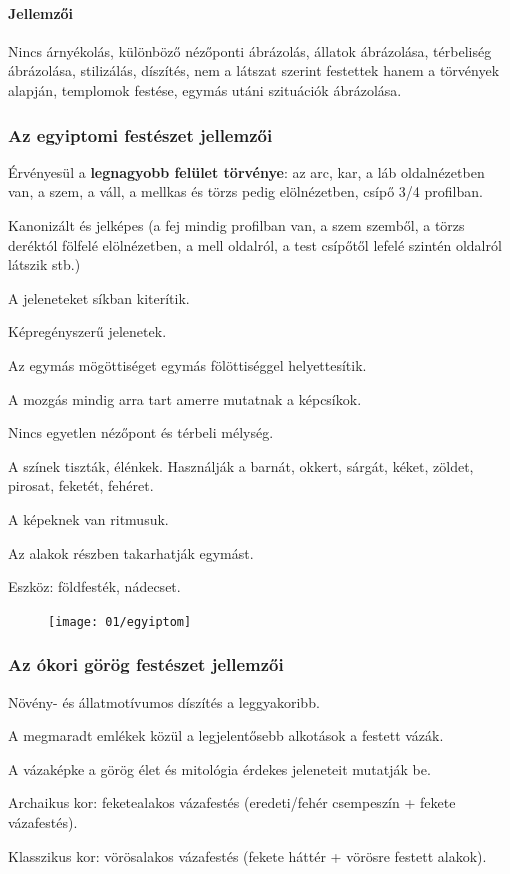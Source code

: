 \paragraph{Jellemzői} Nincs árnyékolás, különböző nézőponti ábrázolás, állatok ábrázolása, térbeliség ábrázolása, stilizálás, díszítés, nem a látszat szerint festettek hanem a törvények alapján, templomok festése, egymás utáni szituációk ábrázolása.


\subsubsection{Az egyiptomi festészet jellemzői}
\begin{compactitem}
	\item Érvényesül a \textbf{legnagyobb felület törvénye}: az arc,  kar, a láb oldalnézetben van, a szem, a váll, a mellkas és törzs pedig elölnézetben, csípő 3/4 profilban.
	\item Kanonizált és jelképes (a fej mindig profilban van, a szem szemből, a törzs deréktól
	fölfelé elölnézetben, a mell oldalról, a test csípőtől lefelé szintén oldalról látszik stb.)
	\item A jeleneteket síkban kiterítik.
	\item Képregényszerű jelenetek.
	\item Az egymás mögöttiséget egymás fölöttiséggel helyettesítik.
	\item A mozgás mindig arra tart amerre mutatnak a képcsíkok.
	\item Nincs egyetlen nézőpont és térbeli mélység.
	\item A színek tiszták, élénkek. Használják a barnát, okkert, sárgát, kéket, zöldet, pirosat,
	feketét, fehéret.
	\item A képeknek van ritmusuk.
	\item Az alakok részben takarhatják egymást.
	\item Eszköz: földfesték, nádecset.
\end{compactitem}

\begin{figure}[H]
	\centering
	\texttt{[image: 01/egyiptom]}
\end{figure}


\subsubsection*{Az ókori görög festészet jellemzői}

\begin{compactitem}
	\item Növény- és állatmotívumos díszítés a leggyakoribb.
	\item A megmaradt emlékek közül a legjelentősebb alkotások a festett vázák.
	\item A vázaképke a görög élet és mitológia érdekes jeleneteit mutatják be.
	\item Archaikus kor: feketealakos vázafestés (eredeti/fehér csempeszín + fekete vázafestés).
	\item Klasszikus kor: vörösalakos vázafestés (fekete háttér + vörösre festett alakok).
\end{compactitem}



